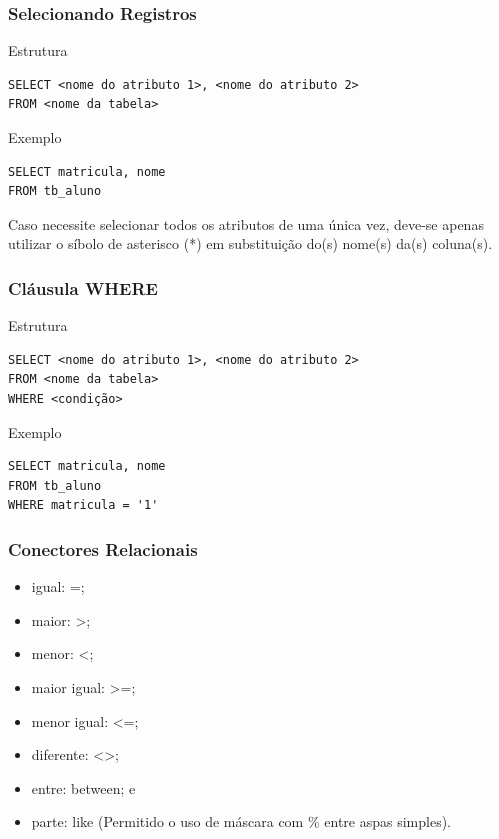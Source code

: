 \documentclass{beamer}
\begin{document}
\begin{frame}[fragile]
\frametitle{Selecionando Registros}

\begin{block}{Estrutura}
\begin{lstlisting}
SELECT <nome do atributo 1>, <nome do atributo 2>
FROM <nome da tabela>
\end{lstlisting}
\end{block}\vfill

\begin{exampleblock}{Exemplo}
\begin{lstlisting}
SELECT matricula, nome
FROM tb_aluno
\end{lstlisting}
\end{exampleblock}\vfill

\alert{Caso necessite selecionar todos os atributos de uma única vez, deve-se
	apenas utilizar o síbolo de asterisco (*) em substituição do(s) nome(s)
	da(s) coluna(s).}
\end{frame}

\begin{frame}[fragile]
\frametitle{Cláusula WHERE}

\begin{block}{Estrutura}
\begin{lstlisting}
SELECT <nome do atributo 1>, <nome do atributo 2>
FROM <nome da tabela>
WHERE <condição>
\end{lstlisting}
\end{block}\vfill

\begin{exampleblock}{Exemplo}
\begin{lstlisting}
SELECT matricula, nome
FROM tb_aluno
WHERE matricula = '1'
\end{lstlisting}
\end{exampleblock}
\end{frame}

\begin{frame}
\frametitle{Conectores Relacionais}

\begin{itemize}
	\item igual: =;
	\item maior: >;
	\item menor: <;
	\item maior igual: >=;
	\item menor igual: <=;
	\item diferente: <>;
	\item entre: between; e
	\item parte: like (Permitido o uso de máscara com \% entre aspas simples).
\end{itemize}
\end{frame}
\end{document}
